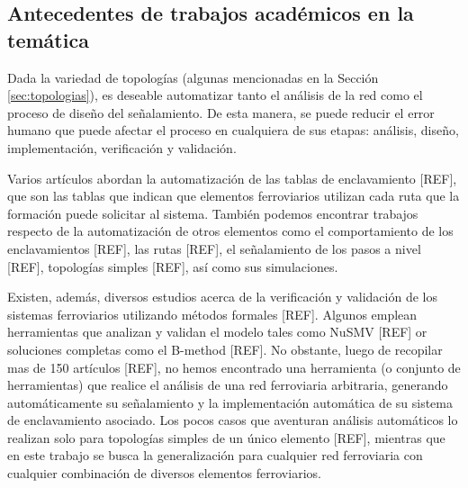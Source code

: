 \subsection{Antecedentes de trabajos académicos en la temática}
\label{sec:estudios}
    Dada la variedad de topologías (algunas mencionadas en la Sección \ref{sec:topologias}), es deseable automatizar tanto el análisis de la red como el proceso de diseño del señalamiento. De esta manera, se puede reducir el error humano que puede afectar el proceso en cualquiera de sus etapas: análisis, diseño, implementación, verificación y validación.

    Varios artículos abordan la automatización de las tablas de enclavamiento [REF], que son las tablas que indican que elementos ferroviarios utilizan cada ruta que la formación puede solicitar al sistema. También podemos encontrar trabajos respecto de la automatización de otros elementos como el comportamiento de los enclavamientos [REF], las rutas [REF], el señalamiento de los pasos a nivel [REF], topologías simples [REF], así como sus simulaciones.

    Existen, además, diversos estudios acerca de la verificación y validación de los sistemas ferroviarios utilizando métodos formales [REF]. Algunos emplean herramientas que analizan y validan el modelo tales como NuSMV [REF] or soluciones completas como el B-method [REF]. No obstante, luego de recopilar mas de 150 artículos [REF], no hemos encontrado una herramienta (o conjunto de herramientas) que realice el análisis de una red ferroviaria arbitraria, generando automáticamente su señalamiento y la implementación automática de su sistema de enclavamiento asociado. Los pocos casos que aventuran análisis automáticos lo realizan solo para topologías simples de un único elemento [REF], mientras que en este trabajo se busca la generalización para cualquier red ferroviaria con cualquier combinación de diversos elementos ferroviarios.